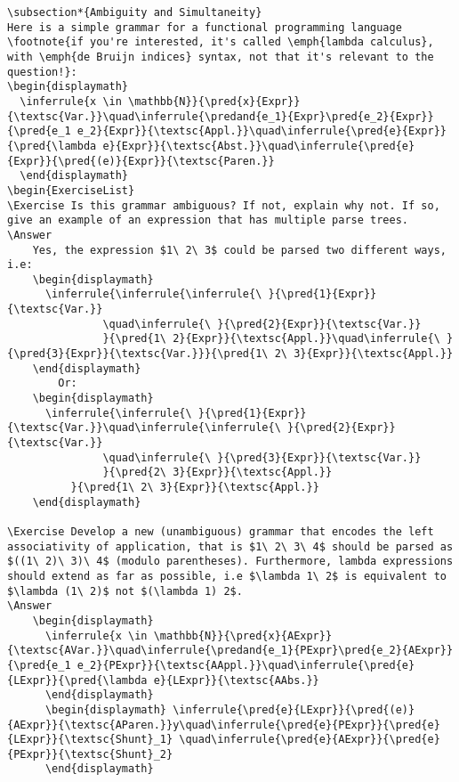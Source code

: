 \documentclass{book}
\begin{document}
\begin{verbatim}
\subsection*{Ambiguity and Simultaneity}
Here is a simple grammar for a functional programming language \footnote{if you're interested, it's called \emph{lambda calculus}, with \emph{de Bruijn indices} syntax, not that it's relevant to the question!}:
\begin{displaymath}
  \inferrule{x \in \mathbb{N}}{\pred{x}{Expr}}{\textsc{Var.}}\quad\inferrule{\predand{e_1}{Expr}\pred{e_2}{Expr}}{\pred{e_1 e_2}{Expr}}{\textsc{Appl.}}\quad\inferrule{\pred{e}{Expr}}{\pred{\lambda e}{Expr}}{\textsc{Abst.}}\quad\inferrule{\pred{e}{Expr}}{\pred{(e)}{Expr}}{\textsc{Paren.}}
  \end{displaymath}   
\begin{ExerciseList}
\Exercise Is this grammar ambiguous? If not, explain why not. If so, give an example of an expression that has multiple parse trees.
\Answer
    Yes, the expression $1\ 2\ 3$ could be parsed two different ways, i.e:
    \begin{displaymath}
      \inferrule{\inferrule{\inferrule{\ }{\pred{1}{Expr}}{\textsc{Var.}}
               \quad\inferrule{\ }{\pred{2}{Expr}}{\textsc{Var.}}
               }{\pred{1\ 2}{Expr}}{\textsc{Appl.}}\quad\inferrule{\ }{\pred{3}{Expr}}{\textsc{Var.}}}{\pred{1\ 2\ 3}{Expr}}{\textsc{Appl.}}
    \end{displaymath}
        Or:
    \begin{displaymath}
      \inferrule{\inferrule{\ }{\pred{1}{Expr}}{\textsc{Var.}}\quad\inferrule{\inferrule{\ }{\pred{2}{Expr}}{\textsc{Var.}}
               \quad\inferrule{\ }{\pred{3}{Expr}}{\textsc{Var.}}
               }{\pred{2\ 3}{Expr}}{\textsc{Appl.}}
          }{\pred{1\ 2\ 3}{Expr}}{\textsc{Appl.}}
    \end{displaymath}

\Exercise Develop a new (unambiguous) grammar that encodes the left associativity of application, that is $1\ 2\ 3\ 4$ should be parsed as $((1\ 2)\ 3)\ 4$ (modulo parentheses). Furthermore, lambda expressions should extend as far as possible, i.e $\lambda 1\ 2$ is equivalent to $\lambda (1\ 2)$ not $(\lambda 1) 2$.
\Answer
    \begin{displaymath}
      \inferrule{x \in \mathbb{N}}{\pred{x}{AExpr}}{\textsc{AVar.}}\quad\inferrule{\predand{e_1}{PExpr}\pred{e_2}{AExpr}}{\pred{e_1 e_2}{PExpr}}{\textsc{AAppl.}}\quad\inferrule{\pred{e}{LExpr}}{\pred{\lambda e}{LExpr}}{\textsc{AAbs.}}
      \end{displaymath}
      \begin{displaymath} \inferrule{\pred{e}{LExpr}}{\pred{(e)}{AExpr}}{\textsc{AParen.}}y\quad\inferrule{\pred{e}{PExpr}}{\pred{e}{LExpr}}{\textsc{Shunt}_1} \quad\inferrule{\pred{e}{AExpr}}{\pred{e}{PExpr}}{\textsc{Shunt}_2}
      \end{displaymath}


\end{verbatim}
\end{document}
